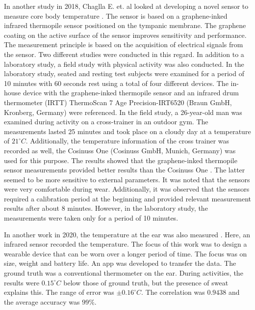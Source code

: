 In another study in 2018, Chaglla E. et. al looked at developing a novel sensor to measure core body temperature \cite{chagllae.MeasurementCoreBody2018}. 
The sensor is based on a graphene-inked infrared thermopile sensor positioned on the tympanic membrane. 
The graphene coating on the active surface of the sensor improves sensitivity and performance. 
The measurement principle is based on the acquisition of electrical signals from the sensor.
Two different studies were conducted in this regard. 
In addition to a laboratory study, a field study with physical activity was also conducted.
In the laboratory study, seated and resting test subjects were examined for a period of 10 minutes with 60 seconds rest using a total of four different devices. 
The in-house device with the graphene-inked thermopile sensor and an infrared drum thermometer (IRTT) ThermoScan 7 Age Precision-IRT6520 (Braun GmbH, Kronberg, Germany) were referenced.
In the field study, a 26-year-old man was examined during activity on a cross-trainer in an outdoor gym. The measurements lasted 25 minutes and took place on a cloudy day at a temperature of $21^\circ C$. 
Additionally, the temperature information of the cross trainer was recorded as well, the Cosinuss One (Cosinuss GmbH, Munich, Germany) was used for this purpose.
The results showed that the graphene-inked thermopile sensor measurements provided better results than the Cosinuss One \cite{chagllae.MeasurementCoreBody2018}. 
The latter seemed to be more sensitive to external parameters. 
It was noted that the sensors were very comfortable during wear. 
Additionally, it was observed that the sensors required a calibration period at the beginning and provided relevant measurement results after about 8 minutes. 
However, in the laboratory study, the measurements were taken only for a period of 10 minutes.

In another work in 2020, the temperature at the ear was also measured \cite{chenInearThermometerWearable2020}.
Here, an infrared sensor recorded the temperature. 
The focus of this work was to design a wearable device that can be worn over a longer period of time. 
The focus was on size, weight and battery life.
An app was developed to transfer the data.
The ground truth was a conventional thermometer on the ear.
During activities, the results were $0.15^\circ C$ below those of ground truth, but the presence of sweat explains this.
The range of error was $\pm 0.16 ^\circ C$.
The correlation was $0.9438$ and the average accuracy was $99\%$.

